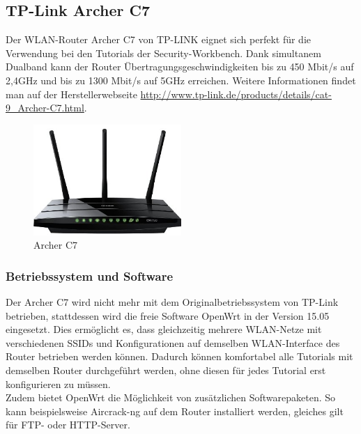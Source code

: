 \subsection{TP-Link Archer C7}
 Der WLAN-Router Archer C7 von TP-LINK eignet sich perfekt für die Verwendung bei den Tutorials der Security-Workbench. Dank simultanem Dualband kann der Router Übertragungsgeschwindigkeiten bis zu 450 Mbit/s auf 2,4GHz und bis zu 1300 Mbit/s auf 5GHz erreichen. Weitere Informationen findet man auf der Herstellerwebseite \url{http://www.tp-link.de/products/details/cat-9_Archer-C7.html}.

\begin{figure}[H]
	\centering
	\includegraphics[width=0.5\textwidth]{images/WLAN/ArcherC7.jpg}
	\caption{Archer C7}
	\label{fig:Archer C7}
\end{figure}

\subsubsection{Betriebssystem und Software}
Der Archer C7 wird nicht mehr mit dem Originalbetriebssystem von TP-Link betrieben, stattdessen wird die freie Software OpenWrt in der Version 15.05 eingesetzt. Dies ermöglicht es, dass gleichzeitig mehrere WLAN-Netze mit verschiedenen SSIDs und Konfigurationen auf demselben WLAN-Interface des Router betrieben werden können. Dadurch können komfortabel alle Tutorials mit demselben Router durchgeführt werden, ohne diesen für jedes Tutorial erst konfigurieren zu müssen.\\
Zudem bietet OpenWrt die Möglichkeit von zusätzlichen Softwarepaketen. So kann beispielsweise Aircrack-ng auf dem Router installiert werden, gleiches gilt für FTP- oder HTTP-Server.

